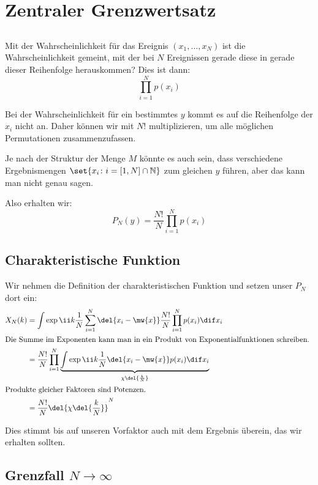 \section{Zentraler Grenzwertsatz}

\subsection{}

Mit der Wahrscheinlichkeit für das Ereignis $(x_1, \ldots, x_N)$ ist die
Wahrscheinlichkeit gemeint, mit der bei $N$ Ereignissen gerade diese in gerade
dieser Reihenfolge herauskommen? Dies ist dann:
\[
    \prod_{i=1}^N p(x_i)
\]

Bei der Wahrscheinlichkeit für ein bestimmtes $y$ kommt es auf die Reihenfolge
der $x_i$ nicht an. Daher können wir mit $N!$ multiplizieren, um alle möglichen
Permutationen zusammenzufassen.

Je nach der Struktur der Menge $M$ könnte es auch sein, dass verschiedene
Ergebnismengen $\set{x_i \colon i = [1, N] \cap \mathbb N}$ zum gleichen $y$
führen, aber das kann man nicht genau sagen.

Also erhalten wir:
\[
    P_N(y) = \frac{N!}{N} \prod_{i=1}^N p(x_i)
\]

\subsection{Charakteristische Funktion}

Wir nehmen die Definition der charakteristischen Funktion und setzen unser
$P_N$ dort ein:
\begin{align*}
    X_N(k)
    &= \int \exp{\ii k \frac 1N \sum_{i=1}^N \del{x_i - \mw{x}}}
    \frac{N!}N \prod_{i=1}^N p(x_i) \dif x_i \\
    \intertext{%
        Die Summe im Exponenten kann man in ein Produkt von
        Exponentialfunktionen schreiben.
    }
    &= \frac{N!}N \prod_{i=1}^N \underbrace{\int
        \exp{\ii k \frac 1N \del{x_i - \mw{x}}}
    p(x_i) \dif x_i}_{\chi\del{\frac kN}} \\
    \intertext{%
        Produkte gleicher Faktoren sind Potenzen.
    }
    &= \frac{N!}N \del{\chi\del{\frac kN}}^N
\end{align*}

Dies stimmt bis auf unseren Vorfaktor auch mit dem Ergebnis überein, das wir
erhalten sollten.

\subsection{Grenzfall $N\to\infty$}


